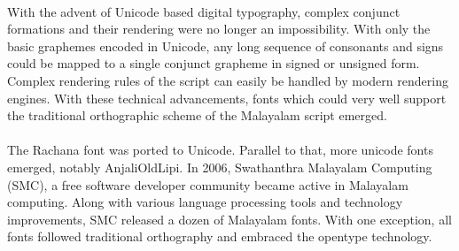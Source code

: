 \documentclass[10pt]{article}
\begin{document}
\paragraph{}
With the advent of Unicode based digital typography, complex conjunct formations and their rendering were no longer an impossibility. With only the basic graphemes encoded in Unicode, any long sequence of consonants and signs could be mapped to a single conjunct grapheme in signed or unsigned form. Complex rendering rules of the script can easily be handled by modern rendering engines. With these technical advancements, fonts which could very well support the traditional orthographic scheme of the Malayalam script emerged. 


\paragraph{}
The Rachana font was ported to Unicode. Parallel to that, more unicode fonts emerged, notably AnjaliOldLipi. In 2006, Swathanthra Malayalam Computing (SMC), a free software developer community became active in Malayalam computing. Along with various language processing tools and technology improvements, SMC released a dozen of Malayalam fonts. With one exception, all fonts followed traditional orthography and embraced the opentype technology. 
\end{document}
